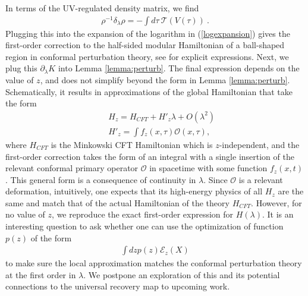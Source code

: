 \documentclass[a4paper,11pt]{article}
\theoremstyle{definition}
\newcommand{\nn}{\nonumber}
\newcommand{\lb}{\left(}
\newcommand{\rb}{\right)}
\newcommand{\mO}{\mathcal{O}}
\newcommand{\p}{\partial}
\begin{document}
\begin{enumerate}
In terms of the UV-regulated density matrix, we find
\begin{eqnarray}
    \rho^{-1}\delta_\lambda \rho=-\int d\tau\:\mathcal{T}\lb V(\tau)\rb\ .
\end{eqnarray}
Plugging this into the expansion of the logarithm in (\ref{logexpansion}) gives the first-order correction to the half-sided modular Hamiltonian of a ball-shaped region in conformal perturbation theory, see \cite{faulkner2015bulk} for explicit expressions. Next, we plug this $\p_\lambda K$ into Lemma \ref{lemma:perturb}. The final expression depends on the value of $z$, and does not simplify beyond the form in Lemma \ref{lemma:perturb}.
Schematically, it results in approximations of the global Hamiltonian that take the form
\begin{eqnarray}
    &&H_z=H_{CFT}+H'_z\lambda+O(\lambda^2)\nn\\
    &&H'_z=\int f_z(x,\tau)\mO(x,\tau),
\end{eqnarray}
where $H_{CFT}$ is the Minkowski CFT Hamiltonian which is $z$-independent, and the first-order correction takes the form of an integral with a single insertion of the relevant conformal primary operator $\mO$ in spacetime with some function $f_z(x,t)$. This general form is a consequence of continuity in $\lambda$. Since $\mO$ is a relevant deformation, intuitively, one expects that its high-energy physics of all $H_z$ are the same and match that of the actual Hamiltonian of the theory $H_{CFT}$. However, for no value of $z$, we reproduce the exact first-order expression for $H(\lambda)$. It is an interesting question to ask whether one can use the optimization of function $p(z)$ of the form
\begin{eqnarray}
    \int dz p(z) \mathcal{E}_z(X)
\end{eqnarray}
to make sure the local approximation matches the conformal perturbation theory at the first order in $\lambda$. We postpone an exploration of this and its potential connections to the universal recovery map to upcoming work.



\end{enumerate}
\end{document}
